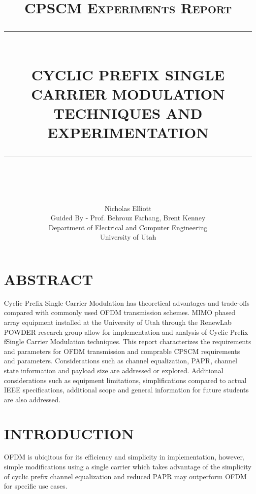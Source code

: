 \documentclass[12pt]{report}
\newcommand{\HRule}[1]{\rule{\linewidth}{#1}}
\begin{document}
\title{ \normalsize \textsc{CPSCM Experiments Report}
		\\ [2.0cm]
		\HRule{0.5pt} \\
		\LARGE \textbf{\uppercase{Cyclic Prefix Single Carrier Modulation Techniques and Experimentation}}
		\HRule{2pt} \\ [0.5cm]
		\normalsize  \vspace*{5\baselineskip}}

\date{}

\author{
		Nicholas Elliott \\
                Guided By - Prof. Behrouz Farhang, Brent Kenney  \\                
Department of Electrical and Computer Engineering\\
University of Utah\\ }

\maketitle

\newpage
\section*{ABSTRACT}

Cyclic Prefix Single Carrier Modulation has theoretical advantages and trade-offs compared with
commonly used OFDM transmission schemes.  MIMO phased array equipment installed at the University of
Utah through the RenewLab POWDER research group allow for implementation and analysis of Cyclic Prefix
fSingle Carrier Modulation techniques.  This report characterizes the requirements and parameters for
OFDM transmission and comprable CPSCM requirements and parameters.  Considerations such as channel equalization, PAPR, channel state information and payload size are addressed or explored.  Additional considerations such as equipment limitations, simplifications compared to actual IEEE specifications, additional scope and general information for future students are also addressed.

\section*{INTRODUCTION}
OFDM is ubiqitous for its efficiency and simplicity in implementation, however, simple modifications using
a single carrier which takes advantage of the simplicity of cyclic prefix channel equalization and reduced PAPR
may outperform OFDM for specific use cases.
\end{document}
